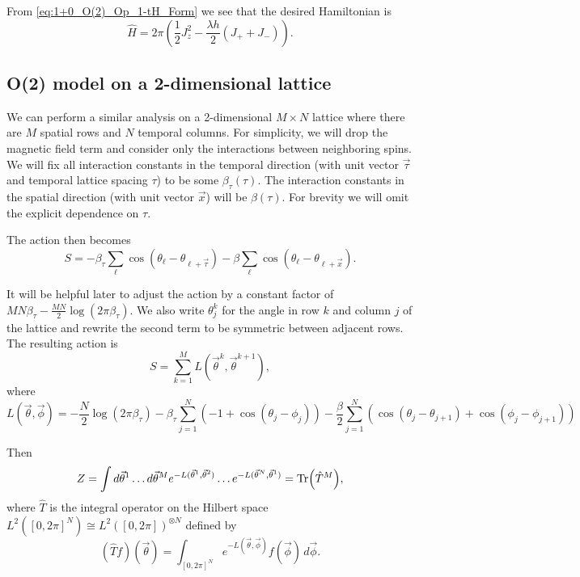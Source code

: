 \documentclass[11pt,reqno]{amsart}
\begin{document}
	From \cref{eq:1+0_O(2)_Op_1-tH_Form} we see that the desired Hamiltonian is 
	\begin{equation}\label{eq:1+0_O(2)_Hamiltonian}
		\hat{H}=2\pi \left( \frac{1}{2}J_z^2- \frac{\lambda h}{2} (J_+ + J_-) \right).
	\end{equation}
	
	\subsection{O(2) model on a 2-dimensional lattice}
	
	We can perform a similar analysis on a 2-dimensional $M\times N$ lattice where there are $M$ spatial rows and $N$ temporal columns. 
	For simplicity, we will drop the magnetic field term and consider only the interactions between neighboring spins. 
	We will fix all interaction constants in the temporal direction (with unit vector $\vec{\tau}$ and temporal lattice spacing $\tau$) to be some $\beta_\tau(\tau)$.
	The interaction constants in the spatial direction (with unit vector $\vec{x}$) will be $\beta(\tau)$.
	For brevity we will omit the explicit dependence on $\tau$.
	
	The action then becomes
		\[S=-\beta_\tau\sum_{\ell}\cos(\theta_\ell-\theta_{\ell+\vec{\tau}})-\beta\sum_{\ell}\cos(\theta_\ell-\theta_{\ell+\vec{x}}). \]
	
	It will be helpful later to adjust the action by a constant factor of $MN\beta_\tau-\frac{MN}{2}\log(2\pi\beta_\tau)$.
	We also write $\theta_j^k$ for the angle in row $k$ and column $j$ of the lattice and rewrite the second term to be symmetric between adjacent rows.
	The resulting action is
		\[ S=\sum_{k=1}^M L(\vec{\theta}^k,\vec{\theta}^{k+1}) ,\]
	where
		\[ L(\vec{\theta},\vec{\phi})=-\frac{N}{2}\log(2\pi\beta_\tau) -\beta_\tau\sum_{j=1}^N (-1+\cos(\theta_j-\phi_j)) -\frac{\beta}{2} \sum_{j=1}^N \left(  \cos(\theta_j-\theta_{j+1}) + \cos(\phi_j-\phi_{j+1}) \right)\]
	
	Then 
		\[ Z=\int d\vec{\theta}^1 \ldots d\vec{\theta}^M e^{-L(\vec{\theta}^1,\vec{\theta}^2)}\ldots e^{-L(\vec{\theta}^N,\vec{\theta}^1)}=\Tr(\hat{T}^M), \]
	where $\hat{T}$ is the integral operator on the Hilbert space $L^2([0,2\pi]^N)\cong L^2([0,2\pi])^{\otimes N}$ defined by 
		\[(\hat{T}f)(\vec{\theta})=\int_{[0,2\pi]^N} e^{-L(\vec{\theta},\vec{\phi})}f(\vec{\phi}) \, d\vec{\phi}.\]
	
\end{document}
